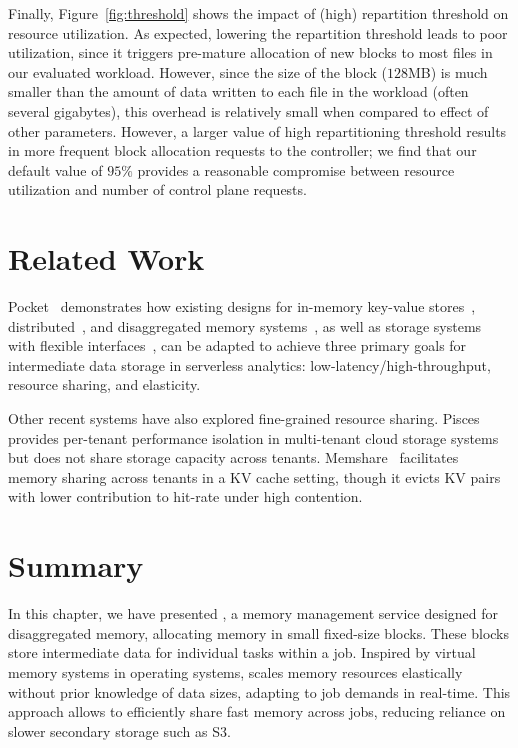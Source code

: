  Finally, Figure~\ref{fig:threshold} shows the impact of (high) repartition threshold on resource utilization. As expected, lowering the repartition threshold leads to poor utilization, since it triggers pre-mature allocation of new blocks to most files in our evaluated workload. However, since the size of the block ($128$MB) is much smaller than the amount of data written to each file in the workload (often several gigabytes), this overhead is relatively small when compared to effect of other parameters. However, a larger value of high repartitioning threshold results in more frequent block allocation requests to the controller; we find that our default value of $95\%$ provides a reasonable compromise between resource utilization and number of control plane requests.


\section{Related Work}
Pocket~\cite{pocket} demonstrates how existing designs for in-memory key-value stores~\cite{redis, farm, memcached, memc3, mica, ramcloud, anna, succinct, blowfish}, distributed~\cite{dsm1, dsm2, dsm3, treadmarks}, and disaggregated memory systems~\cite{infiniswap,remoteregions,legoos,mind}, as well as storage systems with flexible interfaces~\cite{udf1, udf2, udf3, storedprocedure1, storedprocedure2, storedprocedure3, boxwood, sinfonia}, can be adapted to achieve three primary goals for intermediate data storage in serverless analytics: low-latency/high-throughput, resource sharing, and elasticity.

Other recent systems have also explored fine-grained resource sharing. Pisces~\cite{pisces} provides per-tenant performance isolation in multi-tenant cloud storage systems but does not share storage capacity across tenants. Memshare~\cite{memshare} facilitates memory sharing across tenants in a KV cache setting, though it evicts KV pairs with lower contribution to hit-rate under high contention.


\section{Summary}
\label{sec:jiffysummary}
In this chapter, we have presented \jiffy, a memory management service designed for disaggregated memory, allocating memory in small fixed-size blocks. These blocks store intermediate data for individual tasks within a job. Inspired by virtual memory systems in operating systems, \jiffy scales memory resources elastically without prior knowledge of data sizes, adapting to job demands in real-time. This approach allows \jiffy to efficiently share fast memory across jobs, reducing reliance on slower secondary storage such as S3.








